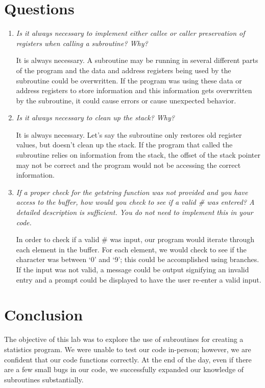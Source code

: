 \documentclass[10pt, letterpaper, titlepage]{article} %
\begin{document}
\begin{multicols*}{2}
\section{Questions}
\begin{enumerate}
\item \textit{Is it always necessary to implement either callee or caller preservation of registers when calling a subroutine? Why?}

It is always necessary. 
A subroutine may be running in several different parts of the program and the data and address registers being used by the subroutine could be overwritten. 
If the program was using these data or address registers to store information and this information gets overwritten by the subroutine, it could cause errors or cause unexpected behavior.

\item \textit{Is it always necessary to clean up the stack? Why?}

It is always necessary. 
Let's say the subroutine only restores old register values, but doesn't clean up the stack. 
If the program that called the subroutine relies on information from the stack, the offset of the stack pointer may not be correct and the program would not be accessing the correct information. 

\item \textit{If a proper check for the getstring function was not provided and you have access to the buffer, how would you check to see if a valid \# was entered? A detailed description is sufficient. You do not need to implement this in your code.}

In order to check if a valid \# was input, our program would iterate through each element in the buffer. 
For each element, we would check to see if the character was between `0' and `9'; this could be accomplished using branches. 
If the input was not valid, a message could be output signifying an invalid entry and a prompt could be displayed to have the user re-enter a valid input. 
\end{enumerate}

\section{Conclusion}
The objective of this lab was to explore the use of subroutines for creating a statistics program. 
We were unable to test our code in-person; however, we are confident that our code functions correctly. 
At the end of the day, even if there are a few small bugs in our code, we successfully expanded our knowledge of subroutines substantially.


\end{multicols*}
\end{document}
